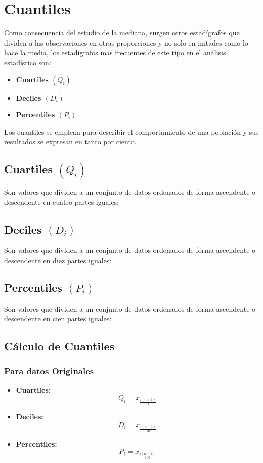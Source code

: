 \section{Cuantiles}
Como consecuencia del estudio de la mediana, surgen otros estadígrafos que dividen a las observaciones en otras proporciones y no solo en mitades como lo hace la media, los estadígrafos mas frecuentes de este tipo en el análisis estadístico son:
\begin{itemize}
\item \textbf{Cuartiles $(Q_i)$}
\item \textbf{Deciles $(D_i)$}
\item \textbf{Percentiles $(P_i)$}
\end{itemize}
Los cuantiles se emplean para describir el comportamiento de una población y sus resultados se expresan en tanto por ciento.
\subsection{Cuartiles $(Q_i)$}
Son valores que dividen a un conjunto de datos ordenados de forma ascendente o descendente en cuatro partes iguales:
\begin{center}
\end{center}
\subsection{Deciles $(D_i)$}
Son valores que dividen a un conjunto de datos ordenados de forma ascendente o descendente en diez partes iguales:
\subsection{Percentiles $(P_i)$}
Son valores que dividen a un conjunto de datos ordenados de forma ascendente o descendente en cien partes iguales:
\subsection{Cálculo de Cuantiles}
\subsubsection{Para datos Originales}
\begin{itemize}
\item \textbf{Cuartiles:}
$$Q_i=x_{\frac{i(n+1)}{4}}$$
\item \textbf{Deciles:}
$$D_i=x_{\frac{i(n+1)}{10}}$$
\item \textbf{Percentiles:}
$$P_i=x_{\frac{i(n+1)}{100}}$$
\end{itemize}
